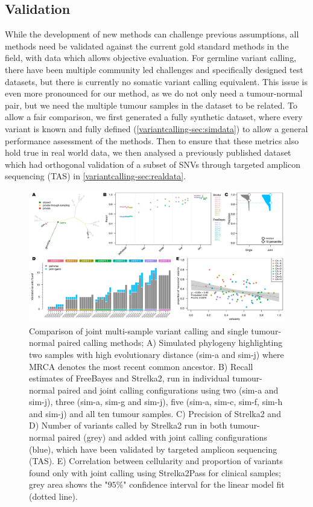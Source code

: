 \subsection{Validation}

While the development of new methods can challenge previous assumptions, all methods need be validated against the current gold standard methods in the field, with data which allows objective evaluation. For germline variant calling, there have been multiple community led challenges and specifically designed test datasets, but there is currently no somatic variant calling equivalent. This issue is even more pronounced for our method, as we do not only need a tumour-normal pair, but we need the multiple tumour samples in the dataset to be related. To allow a fair comparison, we first generated a fully synthetic dataset, where every variant is known and fully defined (\autoref{variantcalling-sec:simdata}) to allow a general performance assessment of the methods. Then to ensure that these metrics also hold true in real world data, we then analysed a previously published dataset which had orthogonal validation of a subset of SNVs through targeted amplicon sequencing (TAS) in \autoref{variantcalling-sec:realdata}.

\begin{figure}[!tpb]
\centering
  \includegraphics[width=\textwidth]{Appendices/Variantcalling/Figure_1}\vspace*{-12pt}
  \caption[Comparison of joint multi-sample and single tumour-normal paired variant calling methods]{Comparison of joint multi-sample variant calling and single tumour-normal paired calling methods; A) Simulated phylogeny highlighting two samples with high evolutionary distance (sim-a and sim-j) where MRCA denotes the most recent common ancestor. B) Recall estimates of FreeBayes and Strelka2, run in individual tumour-normal paired and joint calling configurations using two (sim-a and sim-j), three (sim-a, sim-g and sim-j), five (sim-a, sim-c, sim-f, sim-h and sim-j) and all ten tumour samples. C) Precision of Strelka2 and D) Number of variants called by Strelka2 run in both tumour-normal paired (grey) and added with joint calling configurations (blue), which have been validated by targeted amplicon sequencing (TAS). E) Correlation between cellularity and proportion of variants found only with joint calling using Strelka2Pass for clinical samples; grey area shows the "$95\%$" confidence interval for the linear model fit (dotted line).}\label{fig:varcalling:fig1}
\end{figure}

